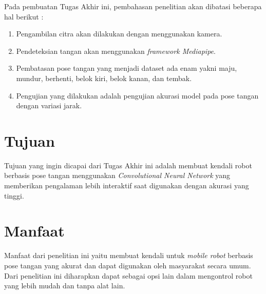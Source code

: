 Pada pembuatan Tugas Akhir ini, pembahasan penelitian akan dibatasi beberapa hal berikut :
\begin{enumerate}
	\item Pengambilan citra akan dilakukan dengan menggunakan kamera.
	\item Pendeteksian tangan akan menggunakan \textit{framework Mediapipe}.
	\item Pembatasan pose tangan yang menjadi dataset ada enam yakni maju, mundur, berhenti, belok kiri, belok kanan, dan tembak.
	\item Pengujian yang dilakukan adalah pengujian akurasi model pada pose tangan dengan variasi jarak.
\end{enumerate}

\section{Tujuan}

Tujuan yang ingin dicapai dari Tugas Akhir ini adalah membuat kendali robot berbasis pose tangan menggunakan \textit{Convolutional Neural Network} yang memberikan pengalaman lebih interaktif saat digunakan dengan akurasi yang tinggi.


\section{Manfaat}
Manfaat dari penelitian ini yaitu membuat kendali untuk \textit{mobile robot} berbasis pose tangan yang akurat dan dapat digunakan oleh masyarakat secara umum. Dari penelitian ini diharapkan dapat sebagai opsi lain dalam mengontrol robot yang lebih mudah dan tanpa alat lain.
